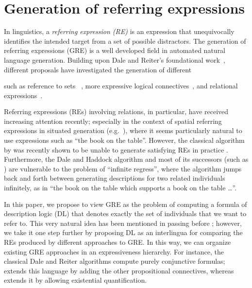 \section{Generation of referring expressions}\label{sec:gre}

In linguistics, a \emph{referring expression (RE)} is an expression that 
unequivocally identifies the intended target from a set of possible distractors.  
The generation of referring expressions (GRE) is a well developed field in automated natural language generation.
Building upon Dale and Reiter's foundational work~\cite{dale89cooking,Dale1995},
different proposals have investigated the generation of different 

such as reference to sets
~\cite{Stone2000}, more expressive logical connectives~\cite{deemter02:_gener_refer_expres}, and relational expressions~\cite{dale91:_gener_refer_expres_invol_relat}.

Referring expressions (REs) involving relations, in particular, have
received increasing attention recently; especially in the context of
spatial referring expressions in situated generation (e.g.\
\cite{kelleher06:_increm_gener_of_spatial_refer}), where it seems
particularly natural to use expressions such as ``the book on the
table''.  However, the classical algorithm by
\cite{dale91:_gener_refer_expres_invol_relat} was recently shown to
be unable to generate satisfying REs in practice
\cite{viethen06:_algor_for_gener_refer_expres}.  Furthermore, the Dale
and Haddock algorithm and most of its successors (such as
\cite{kelleher06:_increm_gener_of_spatial_refer}) are vulnerable to
the problem of ``infinite regress'', where the algorithm jumps back
and forth between generating descriptions for two related individuals
infinitely, as in ``the book on the table which supports a book on the
table \ldots''.


In this paper, we propose to view GRE as the problem of computing a
formula of description logic (DL) that denotes exactly the set of
individuals that we want to refer to.  This very natural idea has been
mentioned in passing before
\cite{Krahmer2003,gardent07:_gener_bridg_defin_descr}; however, we
take it one step further by proposing DL as an interlingua for
comparing the REs produced by different approaches to GRE.  In this
way, we can organize existing GRE approaches in an expressiveness
hierarchy.  For instance, the classical Dale and Reiter algorithms
compute purely conjunctive formulas;
\cite{deemter02:_gener_refer_expres} extends this language by
adding the other propositional connectives, whereas
\cite{dale91:_gener_refer_expres_invol_relat} extends it by
allowing existential quantification.

